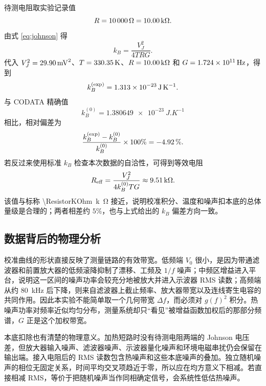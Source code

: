 \documentclass[11pt]{article}
\begin{document}
待测电阻取实验记录值
\begin{equation}
    R=\SI{10000}{\ohm}=\SI{10.00}{k\ohm}.
\end{equation}
由式 \eqref{eq:johnson} 得
\begin{equation}
    k_B=\frac{V_J^2}{4TRG}.
\end{equation}
代入 $V_J^2=\SI{29.90}{mV^2}$、$T=\SI{330.35}{K}$、$R=\SI{10.00}{k\ohm}$ 和 $G=\SI{1.724e+11}{Hz}$，得到
\begin{equation}
    k_B^{(\mathrm{exp})}
    =\SI{1.313e-23}{J.K^{-1}}.
\end{equation}
与 CODATA 精确值
\begin{equation}
    k_B^{(0)}=\SI{1.380649e-23}{J.K^{-1}}
\end{equation}
相比，相对偏差为
\begin{equation}
    \frac{k_B^{(\mathrm{exp})}-k_B^{(0)}}{k_B^{(0)}}\times 100\%
    =\SI{-4.92}{\percent}.
\end{equation}
若反过来使用标准 $k_B$ 检查本次数据的自洽性，可得到等效电阻
\begin{equation}
    R_{\mathrm{eff}}
    =\frac{V_J^2}{4k_B^{(0)}TG}
    \approx \SI{9.51}{k\ohm}.
\end{equation}
该值与标称 \SI{\ResistorKOhm}{k\ohm} 接近，说明校准积分、温度和噪声扣本底的总体量级是合理的；两者相差约 $5\%$，也与上式给出的 $k_B$ 偏差方向一致。

\subsection{数据背后的物理分析}

校准曲线的形状直接反映了测量链路的有效带宽。低频端 $V_0$ 很小，是因为带通滤波器和前置放大器的低频滚降抑制了漂移、工频及 $1/f$ 噪声；中频区增益进入平台，说明这一区间的噪声功率会较充分地被放大并进入示波器 RMS 读数；高频端从约 \SI{80}{kHz} 后下降，则来自滤波器上截止频率、放大器带宽以及连线寄生电容的共同作用。因此本实验不能简单取一个几何带宽 $\Delta f$，而必须对 $g(f)^2$ 积分。热噪声功率对频率近似均匀分布，测量系统却只“看见”被增益函数加权后的那部分频谱，$G$ 正是这个加权带宽。

本底扣除也有清楚的物理意义。加热短路时没有待测电阻两端的 Johnson 电压差，但放大器输入噪声、滤波器噪声、示波器量化噪声和环境电磁串扰仍会保留在输出端。接入电阻后的 RMS 读数包含热噪声和这些本底噪声的叠加。独立随机噪声的相位无固定关系，时间平均交叉项趋近于零，所以应在均方意义下相减。若直接相减 RMS，等价于把随机噪声当作同相确定信号，会系统性低估热噪声。
\end{document}
